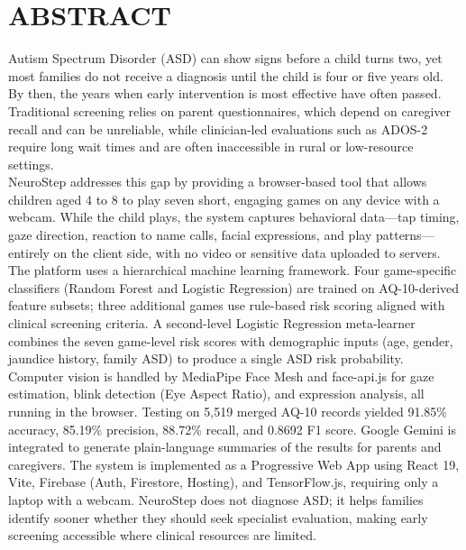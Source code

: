\documentclass[12pt,a4paper]{report}
\begin{document}
\chapter*{ABSTRACT}
Autism Spectrum Disorder (ASD) can show signs before a child turns two, yet most families do not receive a diagnosis until the child is four or five years old. By then, the years when early intervention is most effective have often passed. Traditional screening relies on parent questionnaires, which depend on caregiver recall and can be unreliable, while clinician-led evaluations such as ADOS-2 require long wait times and are often inaccessible in rural or low-resource settings.\\ NeuroStep addresses this gap by providing a browser-based tool that allows children aged 4 to 8 to play seven short, engaging games on any device with a webcam. While the child plays, the system captures behavioral data—tap timing, gaze direction, reaction to name calls, facial expressions, and play patterns—entirely on the client side, with no video or sensitive data uploaded to servers.\\
The platform uses a hierarchical machine learning framework. Four game-specific classifiers (Random Forest and Logistic Regression) are trained on AQ-10-derived feature subsets; three additional games use rule-based risk scoring aligned with clinical screening criteria. A second-level Logistic Regression meta-learner combines the seven game-level risk scores with demographic inputs (age, gender, jaundice history, family ASD) to produce a single ASD risk probability. Computer vision is handled by MediaPipe Face Mesh and face-api.js for gaze estimation, blink detection (Eye Aspect Ratio), and expression analysis, all running in the browser. Testing on 5,519 merged AQ-10 records yielded 91.85\% accuracy, 85.19\% precision, 88.72\% recall, and 0.8692 F1 score. Google Gemini is integrated to generate plain-language summaries of the results for parents and caregivers. The system is implemented as a Progressive Web App using React 19, Vite, Firebase (Auth, Firestore, Hosting), and TensorFlow.js, requiring only a laptop with a webcam. NeuroStep does not diagnose ASD; it helps families identify sooner whether they should seek specialist evaluation, making early screening accessible where clinical resources are limited.
\tableofcontents
\listoffigures
\listoftables

\clearpage
{}
\end{document}
